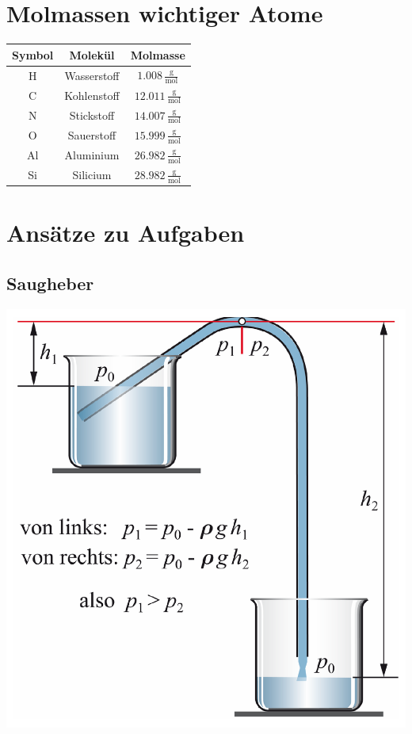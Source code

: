 \section{Molmassen wichtiger Atome}

\begin{tabular}{c | c | c }
\textbf{Symbol} & \textbf{Molekül} & \textbf{Molmasse} \\
\hline
\rule{0pt}{10pt} H & Wasserstoff & $1.008 \, \mathrm{\frac{g}{mol}}$ \\
\rule{0pt}{10pt} C & Kohlenstoff & $12.011 \, \mathrm{\frac{g}{mol}}$ \\
\rule{0pt}{10pt} N & Stickstoff & $14.007 \, \mathrm{\frac{g}{mol}}$ \\
\rule{0pt}{10pt} O & Sauerstoff & $15.999 \, \mathrm{\frac{g}{mol}}$ \\
\rule{0pt}{10pt} Al & Aluminium & $26.982 \, \mathrm{\frac{g}{mol}}$ \\
\rule{0pt}{10pt} Si & Silicium & $28.982 \, \mathrm{\frac{g}{mol}}$ \\
\end{tabular}




\section{Ansätze zu Aufgaben}

\subsection{Saugheber}
\includegraphics[width=.65\linewidth]{Bilder/saugheber.png}


